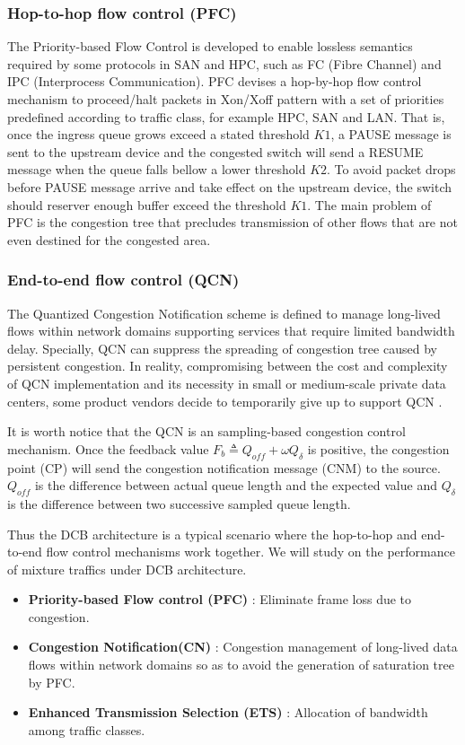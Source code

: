 \documentclass[]{sig-alternate-10pt}
\begin{document}
\subsubsection{Hop-to-hop flow control (PFC)}
The Priority-based Flow Control \cite{ieee8021qbb} is developed to enable lossless semantics required by some protocols in SAN and HPC, such as FC (Fibre Channel) and IPC (Interprocess Communication). PFC devises a hop-by-hop flow control mechanism to proceed/halt packets in Xon/Xoff pattern with a set of priorities predefined according to traffic class, for example HPC, SAN and LAN.
That is, once the ingress queue grows exceed a stated threshold $K1$, a PAUSE message is sent to the upstream device and the congested switch will send a RESUME message when the queue falls bellow a lower threshold $K2$.
To avoid packet drops before PAUSE message arrive and take effect on the upstream device, the switch should reserver enough buffer exceed the threshold $K1$.
The main problem of PFC is the congestion tree that precludes transmission of other flows that are not even destined for the congested area.
\subsubsection{End-to-end flow control (QCN)}
The Quantized Congestion Notification \cite{ieee8021qau} scheme is defined to manage long-lived flows within network domains supporting services that require limited bandwidth delay. Specially, QCN can suppress the spreading of congestion tree caused by persistent congestion. In reality, compromising between the cost and complexity of QCN implementation and its necessity in small or medium-scale private data centers, some product vendors decide to temporarily give up to support QCN \cite{what}.


It is worth notice that the QCN is an sampling-based congestion control mechanism. Once the feedback value $F_b\triangleq Q_{off}+\omega Q_\delta$ is positive, the congestion point (CP) will send the congestion notification message (CNM) to the source. $Q_{off}$ is the difference between actual queue length and the expected value and $Q_\delta$ is the difference between two successive sampled queue length.

Thus the DCB architecture is a typical scenario where the hop-to-hop and end-to-end flow control mechanisms work together. We will study on the performance of mixture traffics under DCB architecture.


\iffalse
\begin{itemize}
	\item \textbf{Priority-based Flow control (PFC)}  : Eliminate frame loss due to congestion.
    \item  \textbf{Congestion Notification(CN)} : Congestion management of long-lived data flows within network domains so as to avoid the generation of saturation tree by PFC.	
	\item \textbf{Enhanced Transmission Selection (ETS)} : Allocation of bandwidth among traffic classes.
\end{itemize}
\end{document}

